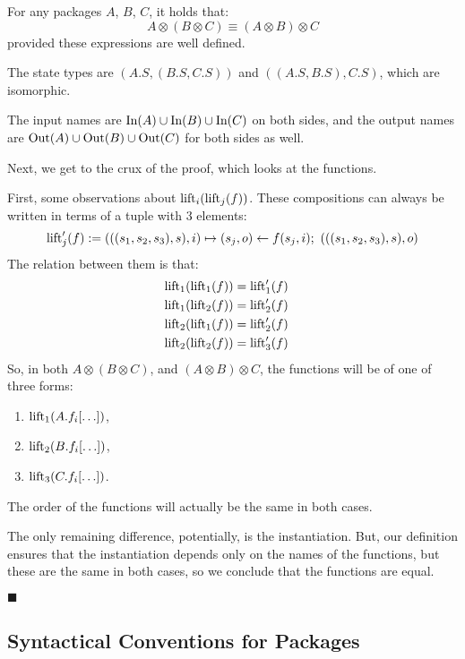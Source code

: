\begin{lemma}
    For any packages $A$, $B$, $C$, it holds that:
    $$
    A \otimes (B \otimes C) \equiv (A \otimes B) \otimes C
    $$
    provided these expressions are well defined.

     The state types are $(A.S, (B.S, C.S))$
    and $((A.S, B.S), C.S)$, which are isomorphic.

    The input names are $\text{In}(A) \cup \text{In}(B) \cup \text{In}(C)$
    on both sides,
    and the output names are $\text{Out}(A) \cup \text{Out}(B) \cup \text{Out}(C)$
    for both sides as well.

    Next, we get to the crux of the proof, which looks at the functions.

    First, some observations about $\text{lift}_{i}(\text{lift}_j(f))$.
    These compositions can always be written in terms of a tuple with
    3 elements:
    $$
    \text{lift}'_j(f) := (((s_1, s_2, s_3), s), i) \mapsto (s_j, o) \gets f(s_j, i);\ (((s_1, s_2, s_3), s), o)
    $$
    The relation between them is that:
    $$
    \begin{aligned}
    &\text{lift}_1(\text{lift}_1(f)) = \text{lift}'_1(f)\cr
    &\text{lift}_1(\text{lift}_2(f)) = \text{lift}'_2(f)\cr
    &\text{lift}_2(\text{lift}_1(f)) = \text{lift}'_2(f)\cr
    &\text{lift}_2(\text{lift}_2(f)) = \text{lift}'_3(f)\cr
    \end{aligned}
    $$
    So, in both $A \otimes (B \otimes C)$, and $(A \otimes B) \otimes C$, the functions will be of one of three forms:
    \begin{enumerate}
        \item $\text{lift}_1(A.f_i[\ldots])$,
        \item $\text{lift}_2(B.f_i[\ldots])$,
        \item $\text{lift}_3(C.f_i[\ldots])$.
    \end{enumerate}

    The order of the functions will actually be the same in both cases.

    The only remaining difference, potentially, is the instantiation.
    But, our definition ensures that the instantiation depends only on the names
    of the functions, but these are the same in both cases,
    so we conclude that the functions are equal.

    $\blacksquare$
\end{lemma}

\subsection{Syntactical Conventions for Packages}